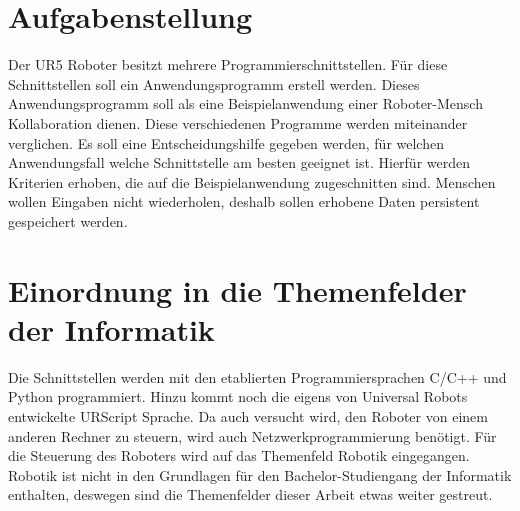 \section{Aufgabenstellung}
\label{aufgabenstellung}

Der UR5 Roboter besitzt mehrere Programmierschnittstellen. Für diese Schnittstellen soll ein Anwendungsprogramm erstell werden.
Dieses Anwendungsprogramm soll als eine Beispielanwendung einer Roboter-Mensch Kollaboration dienen.
Diese verschiedenen Programme werden miteinander verglichen. Es soll eine Entscheidungshilfe gegeben werden, für welchen Anwendungsfall welche Schnittstelle am besten geeignet ist. Hierfür werden Kriterien erhoben, die auf die Beispielanwendung zugeschnitten sind.
Menschen wollen Eingaben nicht wiederholen, deshalb sollen erhobene Daten persistent gespeichert werden.

\section{Einordnung in die Themenfelder der Informatik}
\label{sec:einordnung}

Die Schnittstellen werden mit den etablierten Programmiersprachen C/C++ und Python programmiert. Hinzu kommt noch die eigens von Universal Robots entwickelte URScript Sprache.
Da auch versucht wird, den Roboter von einem anderen Rechner zu steuern, wird auch Netzwerkprogrammierung benötigt.
Für die Steuerung des Roboters wird auf das Themenfeld Robotik eingegangen. Robotik ist nicht in den Grundlagen für den Bachelor-Studiengang der Informatik enthalten, deswegen sind die Themenfelder dieser Arbeit etwas weiter gestreut.